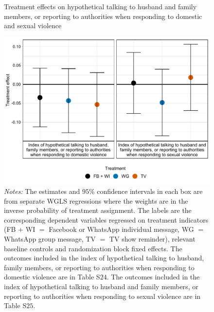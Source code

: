 \documentclass[12pt]{article}
\begin{document}
\begin{figure}[H]
    \centering
    \caption{Treatment effects on hypothetical talking to husband and family members, or reporting to authorities when responding to domestic and sexual violence}
    \includegraphics[width=12cm, height=9cm\textwidth]{Figures/RF-FS/FigureA1.pdf}
    \captionsetup{width=.75\linewidth}
    \caption*{\footnotesize  \textit{Notes:} The estimates and $95$\% confidence intervals in each box are from separate WGLS regressions where the weights are in the inverse probability of treatment assignment. The labels are the corresponding dependent variables regressed on treatment indicators (FB $+$ WI $=$ Facebook or WhatsApp individual message, WG $=$ WhatsApp group message, TV $=$ TV show reminder), relevant baseline controls and randomization block fixed effects. The outcomes included in the index of hypothetical talking to husband, family members, or reporting to authorities when responding to domestic violence are in Table S$24$. The outcomes included in the index of hypothetical talking to husband and family members, or reporting to authorities when responding to sexual violence are in Table S$25$.}
    
\end{figure}
\end{document}
